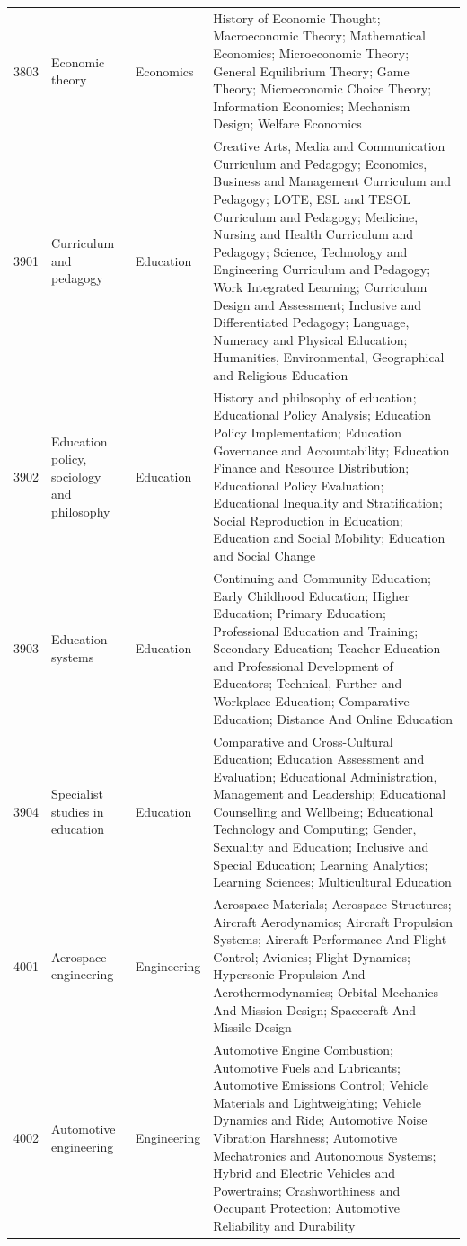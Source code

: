 \begin{longtable}{r p{2.45cm} p{2.55cm} p{6.15cm}}
3803 & Economic theory & Economics & History of Economic Thought; Macroeconomic Theory; Mathematical Economics; Microeconomic Theory; General Equilibrium Theory; Game Theory; Microeconomic Choice Theory; Information Economics; Mechanism Design; Welfare Economics \\
3901 & Curriculum and pedagogy & Education & Creative Arts, Media and Communication Curriculum and Pedagogy; Economics, Business and Management Curriculum and Pedagogy; LOTE, ESL and TESOL Curriculum and Pedagogy; Medicine, Nursing and Health Curriculum and Pedagogy; Science, Technology and Engineering Curriculum and Pedagogy; Work Integrated Learning; Curriculum Design and Assessment; Inclusive and Differentiated Pedagogy; Language, Numeracy and Physical Education; Humanities, Environmental, Geographical and Religious Education \\
3902 & Education policy, sociology and philosophy & Education & History and philosophy of education; Educational Policy Analysis; Education Policy Implementation; Education Governance and Accountability; Education Finance and Resource Distribution; Educational Policy Evaluation; Educational Inequality and Stratification; Social Reproduction in Education; Education and Social Mobility; Education and Social Change \\
3903 & Education systems & Education & Continuing and Community Education; Early Childhood Education; Higher Education; Primary Education; Professional Education and Training; Secondary Education; Teacher Education and Professional Development of Educators; Technical, Further and Workplace Education; Comparative Education; Distance And Online Education \\
3904 & Specialist studies in education & Education & Comparative and Cross-Cultural Education; Education Assessment and Evaluation; Educational Administration, Management and Leadership; Educational Counselling and Wellbeing; Educational Technology and Computing; Gender, Sexuality and Education; Inclusive and Special Education; Learning Analytics; Learning Sciences; Multicultural Education \\
4001 & Aerospace engineering & Engineering & Aerospace Materials; Aerospace Structures; Aircraft Aerodynamics; Aircraft Propulsion Systems; Aircraft Performance And Flight Control; Avionics; Flight Dynamics; Hypersonic Propulsion And Aerothermodynamics; Orbital Mechanics And Mission Design; Spacecraft And Missile Design \\
4002 & Automotive engineering & Engineering & Automotive Engine Combustion; Automotive Fuels and Lubricants; Automotive Emissions Control; Vehicle Materials and Lightweighting; Vehicle Dynamics and Ride; Automotive Noise Vibration Harshness; Automotive Mechatronics and Autonomous Systems; Hybrid and Electric Vehicles and Powertrains; Crashworthiness and Occupant Protection; Automotive Reliability and Durability \\

\end{longtable}
